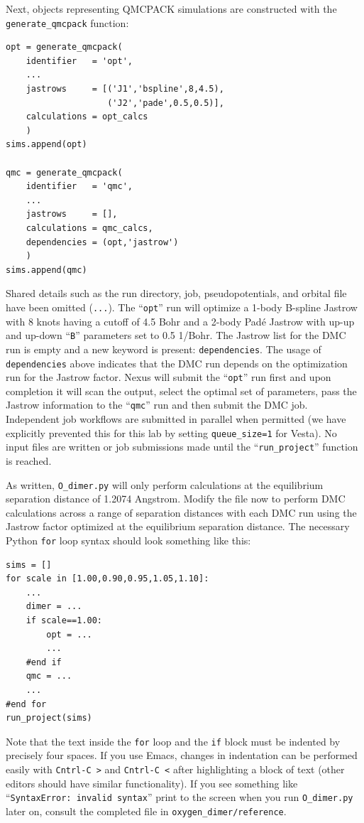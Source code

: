 Next, objects representing QMCPACK simulations are constructed with the \texttt{generate\_qmcpack} function:
\begin{shaded}
\begin{verbatim}
opt = generate_qmcpack(
    identifier   = 'opt',
    ...
    jastrows     = [('J1','bspline',8,4.5), 
                    ('J2','pade',0.5,0.5)],
    calculations = opt_calcs
    )
sims.append(opt)

qmc = generate_qmcpack(
    identifier   = 'qmc',
    ...
    jastrows     = [],            
    calculations = qmc_calcs,
    dependencies = (opt,'jastrow') 
    )
sims.append(qmc)
\end{verbatim}
\end{shaded}
\noindent
Shared details such as the run directory, job, pseudopotentials, and orbital file have been omitted (\texttt{...}).  The ``\texttt{opt}'' run will optimize a 1-body B-spline Jastrow with 8 knots having a cutoff of 4.5 Bohr and a 2-body Pad\'{e} Jastrow with up-up and up-down ``\texttt{B}'' parameters set to 0.5 1/Bohr.  The Jastrow list for the DMC run is empty and a new keyword is present: \texttt{dependencies}.  The usage of \texttt{dependencies} above indicates that the DMC run depends on the optimization run for the Jastrow factor.  Nexus will submit the ``\texttt{opt}'' run first and upon completion it will scan the output, select the optimal set of parameters, pass the Jastrow information to the ``\texttt{qmc}'' run and then submit the DMC job.  Independent job workflows are submitted in parallel when permitted (we have explicitly prevented this for this lab by setting \texttt{queue\_size=1} for Vesta).  No input files are written or job submissions made until the ``\texttt{run\_project}'' function is reached.

As written, \texttt{O\_dimer.py} will only perform calculations at the equilibrium separation distance of 1.2074 Angstrom.  Modify the file now to perform DMC calculations across a range of separation distances with each DMC run using the Jastrow factor optimized at the equilibrium separation distance.  The necessary Python \texttt{for} loop syntax should look something like this:
\begin{shaded}
\begin{verbatim}
sims = []
for scale in [1.00,0.90,0.95,1.05,1.10]:
    ...
    dimer = ...
    if scale==1.00:
        opt = ...
        ...
    #end if
    qmc = ...
    ...
#end for
run_project(sims)
\end{verbatim}
\end{shaded}
\noindent
Note that the text inside the \texttt{for} loop and the \texttt{if} block must be indented by precisely four spaces.  If you use Emacs, changes in indentation can be performed easily with \texttt{Cntrl-C >} and \texttt{Cntrl-C <} after highlighting a block of text (other editors should have similar functionality).  If you see something like  ``\texttt{SyntaxError: invalid syntax}'' print to the screen when you run \texttt{O\_dimer.py} later on, consult the completed file in \texttt{oxygen\_dimer/reference}.

